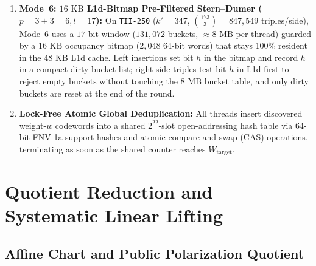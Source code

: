 \documentclass[11pt,a4paper]{article}
\theoremstyle{definition}
\theoremstyle{remark}
\begin{document}
\begin{enumerate}[leftmargin=2em]
\begin{itemize}[leftmargin=1.5em]
    \end{itemize}
    \item \textbf{Mode~6: $16\text{ KB}$ L1d-Bitmap Pre-Filtered Stern--Dumer ($p = 3 + 3 = 6, l = 17$):}
    On \texttt{TII-250} ($k'=347$, $\binom{173}{3} = 847{,}549$ triples/side), Mode~6 uses a $17$-bit window ($131{,}072$ buckets, $\approx 8\text{ MB}$ per thread) guarded by a $16\text{ KB}$ occupancy bitmap ($2{,}048$ $64$-bit words) that stays 100\% resident in the $48\text{ KB}$ L1d cache. Left insertions set bit $h$ in the bitmap and record $h$ in a compact dirty-bucket list; right-side triples test bit $h$ in L1d first to reject empty buckets without touching the $8\text{ MB}$ bucket table, and only dirty buckets are reset at the end of the round.
    \item \textbf{Lock-Free Atomic Global Deduplication:}
    All threads insert discovered weight-$w$ codewords into a shared $2^{22}$-slot open-addressing hash table via $64$-bit FNV-1a support hashes and atomic compare-and-swap (CAS) operations, terminating as soon as the shared counter reaches $W_{\text{target}}$.
\end{enumerate}

\section{Quotient Reduction and Systematic Linear Lifting}
\label{sec:algebraic-lifting}

\subsection{Affine Chart and Public Polarization Quotient}
\label{subsec:quotient-tpub}
\end{document}
